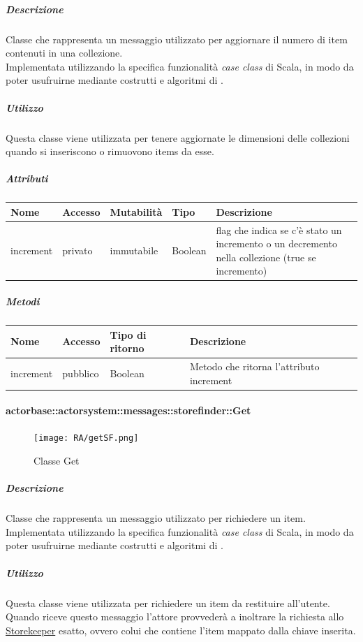 \documentclass{scalatekids-article}
\begin{document}
\subparagraph{Descrizione}
Classe che rappresenta un messaggio utilizzato per aggiornare il numero di item
contenuti in una collezione.\\Implementata utilizzando la specifica funzionalità \textit{case class} di Scala,
in modo da poter usufruirne mediante costrutti e algoritmi di
.

\subparagraph{Utilizzo}
Questa classe viene utilizzata per tenere aggiornate le dimensioni delle
collezioni quando si inseriscono o rimuovono items da esse.

\subparagraph{Attributi}
\begin{tabular}{| p{2cm} | p{1.5cm} | p{2cm} | p{3cm} | p{8.5cm} |}
  \hline
  Nome & Accesso & Mutabilità & Tipo & Descrizione\\
  \hline
  increment & privato & immutabile & Boolean & flag che indica se c'è stato un incremento o un decremento nella collezione (true se incremento)\\
  \hline
\end{tabular}

\subparagraph{Metodi}
\begin{tabular}{| p{3cm} | p{1.5cm} | p{3.5cm} | p{9cm} |}
  \hline
  Nome & Accesso & Tipo di ritorno & Descrizione\\
  \hline
  increment & pubblico & Boolean & Metodo che ritorna l'attributo increment\\
  \hline
\end{tabular}

\paragraph{actorbase::actorsystem::messages::storefinder::Get}
\label{sec:actorbase::actorsystem::messages::storefinder::Get}

\begin{figure}[H]
  \begin{center}
    \texttt{[image: RA/getSF.png]}
    \caption{Classe Get}
  \end{center}
\end{figure}

\subparagraph{Descrizione}
Classe che rappresenta un messaggio utilizzato per richiedere un item.\\Implementata utilizzando la specifica funzionalità \textit{case class} di Scala,
in modo da poter usufruirne mediante costrutti e algoritmi di
.

\subparagraph{Utilizzo}
Questa classe viene utilizzata per richiedere un item da restituire
all'utente.\\Quando riceve questo messaggio l'attore provvederà a inoltrare la
richiesta allo \hyperref[sec:actorbase::actorsystem::actors::storekeeper::Storekeeper]{Storekeeper} esatto, ovvero colui che contiene l'item mappato dalla chiave inserita.
\end{document}
